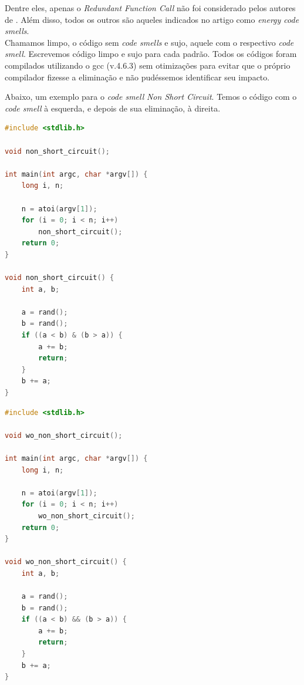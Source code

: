 Dentre eles, apenas o \emph{Redundant Function Call} não foi considerado pelos autores de \cite{vetro2013definition}. Além disso, todos os outros são aqueles indicados no artigo como \emph{energy code smells}. \\

Chamamos limpo, o código sem \emph{code smells} e sujo, aquele com o respectivo \emph{code smell}. Escrevemos código limpo e sujo para cada padrão. Todos os códigos foram compilados utilizando o gcc (v.4.6.3) sem otimizações para evitar que o próprio compilador fizesse a eliminação e não pudéssemos identificar seu impacto.

Abaixo, um exemplo para o \emph{code smell} \emph{Non Short Circuit}. Temos o código com o \emph{code smell} à esquerda, e depois de sua eliminação, à direita.

\begin{center}
\begin{minipage}{.48\textwidth}
\begin{lstlisting}[language=C, basicstyle=\scriptsize\ttfamily, frame=single]
#include <stdlib.h>

void non_short_circuit();

int main(int argc, char *argv[]) {
    long i, n;

    n = atoi(argv[1]);
    for (i = 0; i < n; i++)
        non_short_circuit();
    return 0;
}

void non_short_circuit() {
    int a, b;

    a = rand();
    b = rand();
    if ((a < b) & (b > a)) {
        a += b;
        return;
    }
    b += a;
}
\end{lstlisting}
\end{minipage}
\hfill
\begin{minipage}{.48\textwidth}
\begin{lstlisting}[language=C, basicstyle=\scriptsize\ttfamily, frame=single]
#include <stdlib.h>

void wo_non_short_circuit();

int main(int argc, char *argv[]) {
    long i, n;

    n = atoi(argv[1]);
    for (i = 0; i < n; i++)
        wo_non_short_circuit();
    return 0;
}

void wo_non_short_circuit() {
    int a, b;

    a = rand();
    b = rand();
    if ((a < b) && (b > a)) {
        a += b;
        return;
    }
    b += a;
}
\end{lstlisting}
\end{minipage}
\end{center}


